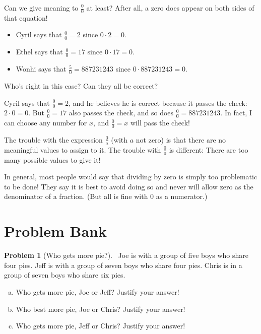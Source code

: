 \documentclass[10pt, reqno]{amsart}
\theoremstyle{remark}
\theoremstyle{definition}
\newtheorem{problem}{Problem}
\numberwithin{equation}{section}  %
\begin{document}
Can we give meaning to $\frac 0 0$ at least?  After all, a zero does appear on both sides of that equation!
\begin{itemize}
\item
Cyril says that $\frac 0 0  = 2$ since $0 \cdot 2 = 0$.\\

\item
Ethel says that $\frac 0 0 = 17$ since $0 \cdot 17 = 0$.\\


\item
Wonhi says that $\frac 5 0  = 887231243$ since $0 \cdot 887231243 = 0$.\\

\end{itemize}

Who's right in this case?  Can they all be correct?  

 Cyril says that $\frac 0 0 = 2$, and
 he believes he is correct because it
passes the check: $2 \cdot 0 = 0$.
 But $\frac 0 0 = 17$ also passes the check, and so does $\frac 0 0 = 887231243$.  In fact, I can choose any number for $x$, and $\frac 0 0 = x$ will pass the check!
 
 The trouble with the expression $\frac 0 a$
(with $a$ not zero) is that there are no meaningful values to
assign to it. 
 The trouble with $\frac 0 0$ is different:
There are too many possible values to
give it!
 
In general, most people would say that dividing by zero is simply too problematic to
be done! They say it is best to avoid doing so and never will allow zero as the
denominator of a fraction. (But all is fine with 0 as a numerator.)




\section{Problem Bank}

\begin{problem}[Who gets more pie?]\ 
Joe is with a group of five boys who share four pies.  Jeff is with a group of seven boys who share four pies.  Chris is in a group of seven boys who share six pies.
\begin{enumerate}[(a)]
\item
  Who gets more pie, Joe or Jeff?  Justify your answer!
\item
Who best more pie, Joe or Chris?  Justify your answer!
\item
Who gets more pie, Jeff or Chris?  Justify your answer!
\end{enumerate}
\end{problem}
\end{document}
